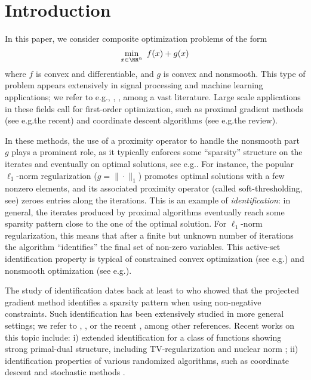 \section{Introduction}

In this paper, we consider composite optimization problems of the form
\begin{equation}\label{eq:main_problem}
	\min_{x\in \RR^n}~f(x)+g(x)
\end{equation}
where $f$ is convex and differentiable, 
and $g$ is convex and nonsmooth. 
This type of problem appears extensively in signal processing and machine learning applications; we refer to e.g.\;\cite{candes2008enhancing}, \cite{combettes2011proximal}, \cite{bach2012optimization}, among a vast literature. Large scale applications in these fields call for first-order optimization, such as proximal gradient methods
(see e.g.\;the recent\;\cite{teboulle2018simplified}) and coordinate descent algorithms (see e.g.\;the review\;\cite{wright2015coordinate}).  


In these methods, the use of a proximity operator to handle the nonsmooth part $g$ plays a prominent role, as it typically enforces some ``sparsity'' structure on the iterates and eventually on optimal solutions, see e.g.\;\cite{vaiter-model-linear15}. For instance, the popular $\ell_1$-norm regularization ($g=\|\cdot\|_1$) promotes optimal solutions with a few nonzero elements, and its associated proximity operator (called soft-thresholding, see\;\cite{donoho1995noising}) zeroes entries along the iterations. This is an example of \emph{identification}: in general, the iterates produced by proximal algorithms eventually reach some sparsity pattern close to the one of the optimal solution. For $\ell_1$-norm regularization, this means that after a finite but unknown number of iterations the algorithm ``identifies'' the final set of non-zero variables. This active-set identification property is typical of constrained convex optimization (see e.g.\;\cite{wright1993identifiable}) and nonsmooth optimization (see e.g.\;\cite{hare2004identifying}).

The study of identification dates back at least to \cite{bertsekas1976goldstein} who showed that the projected gradient method identifies a sparsity pattern when using non-negative constraints. Such identification has been extensively studied in more general settings; we refer to \cite{burke1988identification}, \cite{lewis2002active}, \cite{drusvyatskiy2013optimality} or the recent \cite{lewis2018partial}, among other references.
Recent works on this topic include: i) extended identification for a class of functions showing strong primal-dual structure, including TV-regularization and nuclear norm \cite{fadili2018sensitivity}; ii) identification properties of various randomized algorithms, such as coordinate descent \cite{wright2012accelerated} and stochastic methods \cite{pmlr-v80-poon18a,fadili2018model,sun2019we}.

